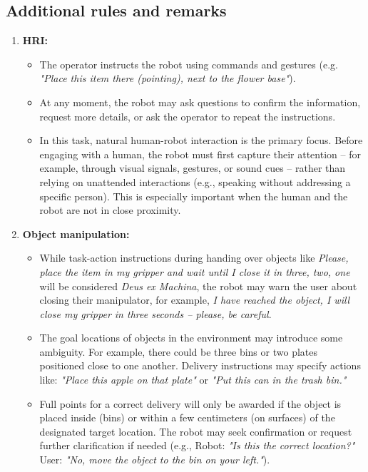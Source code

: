 \subsection*{Additional rules and remarks}
\begin{enumerate}[nosep]
	\item \textbf{HRI:}
	\begin{itemize}[nosep]
		\item The operator instructs the robot using commands and gestures (e.g. \textit{"Place this item there (pointing), next to the flower base"}).
		\item At any moment, the robot may ask questions to confirm the information, request more details, or ask the operator to repeat the instructions.
		\item In this task, natural human-robot interaction is the primary focus. Before engaging with a human, the robot must first capture their attention -- for example, through visual signals, gestures, or sound cues -- rather than relying on unattended interactions (e.g., speaking without addressing a specific person). This is especially important when the human and the robot are not in close proximity.
	\end{itemize}
	\item \textbf{Object manipulation:} 
        \begin{itemize}[nosep]
            \item While task-action instructions during handing over objects like \textit{Please, place the item in my gripper and wait until I close it in three, two, one} will be considered \textit{Deus ex Machina}, the robot may warn the user about closing their manipulator, for example, \textit{I have reached the object, I will close my gripper in three seconds -- please, be careful}.
            \item The goal locations of objects in the environment may introduce some ambiguity. For example, there could be three bins or two plates positioned close to one another. Delivery instructions may specify actions like: \textit{"Place this apple on that plate"} or \textit{"Put this can in the trash bin."}
            \item Full points for a correct delivery will only be awarded if the object is placed inside (bins) or within a few centimeters (on surfaces) of the designated target location. The robot may seek confirmation or request further clarification if needed (e.g., Robot: \textit{"Is this the correct location?"} User: \textit{"No, move the object to the bin on your left."}).
        \end{itemize}
\end{enumerate}

